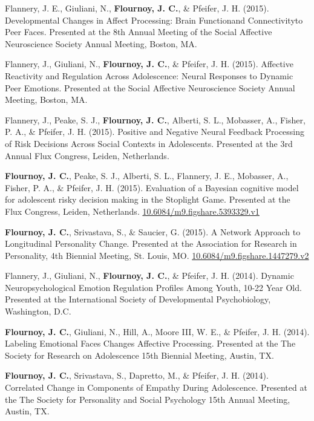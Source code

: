 \documentclass[11pt,article,oneside]{memoir}
\begin{document}
\ind Flannery, J. E., Giuliani, N., \textbf{Flournoy, J. C.}, \& Pfeifer, J. H. (2015). Developmental Changes in Affect Processing: Brain Functionand Connectivityto Peer Faces. Presented at the 8th Annual Meeting of the Social Affective Neuroscience Society Annual Meeting, Boston, MA.

\ind Flannery, J., Giuliani, N., \textbf{Flournoy, J. C.}, \& Pfeifer, J. H. (2015). Affective Reactivity and Regulation Across Adolescence: Neural Responses to Dynamic Peer Emotions. Presented at the Social Affective Neuroscience Society Annual Meeting, Boston, MA.

\ind Flannery, J., Peake, S. J., \textbf{Flournoy, J. C.}, Alberti, S. L., Mobasser, A., Fisher, P. A., \& Pfeifer, J. H. (2015). Positive and Negative Neural Feedback Processing of Risk Decisions Across Social Contexts in Adolescents. Presented at the 3rd Annual Flux Congress, Leiden, Netherlands.

\ind \textbf{Flournoy, J. C.}, Peake, S. J., Alberti, S. L., Flannery, J. E., Mobasser, A., Fisher, P. A., \& Pfeifer, J. H. (2015). Evaluation of a Bayesian cognitive model for adolescent risky decision making in the Stoplight Game. Presented at the Flux Congress, Leiden, Netherlands. \href{https://doi.org/10.6084/m9.figshare.5393329.v1}{10.6084/m9.figshare.5393329.v1}

\ind \textbf{Flournoy, J. C.}, Srivastava, S., \& Saucier, G. (2015). A Network Approach to Longitudinal Personality Change. Presented at the Association for Research in Personality, 4th Biennial Meeting, St. Louis, MO. \newline\href{https://doi.org/10.6084/m9.figshare.1447279.v2}{10.6084/m9.figshare.1447279.v2}

\ind Flannery, J., Giuliani, N., \textbf{Flournoy, J. C.}, \& Pfeifer, J. H. (2014). Dynamic Neuropsychological Emotion Regulation Profiles Among Youth, 10-22 Year Old. Presented at the International Society of Developmental Psychobiology, Washington, D.C.

\ind \textbf{Flournoy, J. C.}, Giuliani, N., Hill, A., Moore III, W. E., \& Pfeifer, J. H. (2014). Labeling Emotional Faces Changes Affective Processing. Presented at the The Society for Research on Adolescence 15th Biennial Meeting, Austin, TX.

\ind \textbf{Flournoy, J. C.}, Srivastava, S., Dapretto, M., \& Pfeifer, J. H. (2014). Correlated Change in Components of Empathy During Adolescence. Presented at the The Society for Personality and Social Psychology 15th Annual Meeting, Austin, TX.
\end{document}
